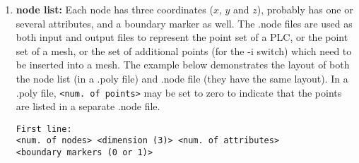 \documentclass[12pt,twoside,a4paper]{article}
\numberwithin{equation}{section}
\begin{document}
\begin{enumerate}
\item \textbf{node list:} Each node has three coordinates ($x$, $y$ and
  $z$), probably has one or several attributes, and a boundary marker as
  well. The .node files are used as both input and output files to represent
  the point set of a PLC, or the point set of a mesh, or the set of
  additional points (for the -i switch) which need to be inserted into a
  mesh. The example below demonstrates the layout of both the node list (in
  a .poly file) and .node file (they have the same layout).  In a .poly
  file, \texttt{<num. of points>} may be set to zero to indicate that the
  points are listed in a separate .node file.
\begin{lstlisting}[style=raycodetetgenpoly,numbers=none]
First line: 
<num. of nodes> <dimension (3)> <num. of attributes> 
<boundary markers (0 or 1)>


\end{lstlisting}
\end{enumerate}
\end{document}
